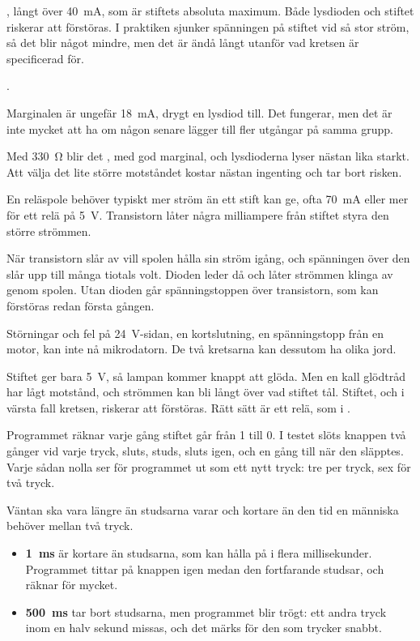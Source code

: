 , långt över 40~mA, som är stiftets absoluta maximum. Både lysdioden
och stiftet riskerar att förstöras. I praktiken sjunker spänningen på stiftet vid så stor ström, så
det blir något mindre, men det är ändå långt utanför vad kretsen är specificerad för.

.

Marginalen är ungefär 18~mA, drygt en lysdiod till. Det fungerar, men det är inte mycket att
ha om någon senare lägger till fler utgångar på samma grupp.

Med 330~Ω blir det , med god marginal, och lysdioderna lyser nästan
lika starkt. Att välja det lite större motståndet kostar nästan ingenting och tar bort risken.

En reläspole behöver typiskt mer ström än ett stift kan ge, ofta 70~mA eller mer för ett relä
på 5~V. Transistorn låter några milliampere från stiftet styra den större strömmen.

När transistorn slår av vill spolen hålla sin ström igång, och spänningen över den slår upp
till många tiotals volt. Dioden leder då och låter strömmen klinga av genom spolen. Utan dioden går
spänningstoppen över transistorn, som kan förstöras redan första gången.

Störningar och fel på 24~V-sidan, en kortslutning, en spänningstopp från en motor, kan inte
nå mikrodatorn. De två kretsarna kan dessutom ha olika jord.

Stiftet ger bara 5~V, så lampan kommer knappt att glöda. Men en kall glödtråd har lågt
motstånd, och strömmen kan bli långt över vad stiftet tål. Stiftet, och i värsta fall kretsen,
riskerar att förstöras. Rätt sätt är ett relä, som i .

Programmet räknar varje gång stiftet går från 1 till 0. I testet slöts knappen två gånger vid
varje tryck, sluts, studs, sluts igen, och en gång till när den släpptes. Varje sådan nolla ser för
programmet ut som ett nytt tryck: tre per tryck, sex för två tryck.

Väntan ska vara längre än studsarna varar och kortare än den tid en människa behöver mellan
två tryck.
\begin{itemize}
  \item \textbf{1~ms} är kortare än studsarna, som kan hålla på i flera millisekunder. Programmet
    tittar på knappen igen medan den fortfarande studsar, och räknar för mycket.
  \item \textbf{500~ms} tar bort studsarna, men programmet blir trögt: ett andra tryck inom en halv
    sekund missas, och det märks för den som trycker snabbt.
\end{itemize}

